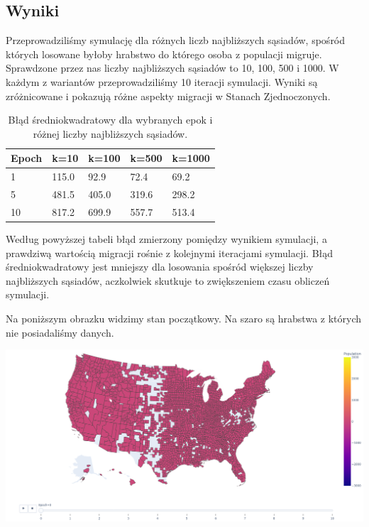 \documentclass[a4paper,12pt]{article}
\begin{document}
\subsection*{Wyniki}
Przeprowadziliśmy symulację dla różnych liczb najbliższych sąsiadów, spośród których losowane byłoby hrabstwo do którego osoba z populacji migruje. Sprawdzone przez nas liczby najbliższych sąsiadów to 10, 100, 500 i 1000. W każdym z wariantów przeprowadziliśmy 10 iteracji symulacji. Wyniki są zróżnicowane i pokazują różne aspekty migracji w Stanach Zjednoczonych. 
\begin{center}
    \begin{table}[!htbp]
        \centering
        \begin{tabular}{ |p{1.5cm}||p{2.5cm}|p{2.5cm}|p{2.5cm}|p{2.5cm}|  }
             \hline
             Epoch&k=10&k=100&k=500&k=1000\\
             \hline
             1&115.0&92.9&72.4&69.2\\
             \hline
             5&481.5&405.0&319.6&298.2\\
             \hline
             10&817.2&699.9&557.7&513.4\\
             \hline
        \end{tabular}
        \caption{Błąd średniokwadratowy dla wybranych epok i różnej liczby najbliższych sąsiadów.}
        \label{tab:my_label}
    \end{table}
\end{center}
Według powyższej tabeli błąd zmierzony pomiędzy wynikiem symulacji, a prawdziwą wartością migracji rośnie z kolejnymi iteracjami symulacji. Błąd średniokwadratowy jest mniejszy dla losowania spośród większej liczby najbliższych sąsiadów, aczkolwiek skutkuje to zwiększeniem czasu obliczeń symulacji.   


Na poniższym obrazku widzimy stan początkowy. Na szaro są hrabstwa z których nie posiadaliśmy danych. 
\begin{center}
    \includegraphics*[width=15cm]{./pictures/base_population.png}
\end{center}
\end{document}
